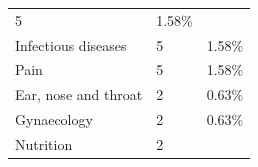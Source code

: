 \documentclass[]{article}
\begin{document}
\begin{longtable}[]{@{}lll@{}}
\begin{minipage}[t]{0.18\columnwidth}
5\strut
\end{minipage} & \begin{minipage}[t]{0.18\columnwidth}\raggedright
1.58\%\strut
\end{minipage}\tabularnewline
\begin{minipage}[t]{0.34\columnwidth}\raggedright
Infectious diseases\strut
\end{minipage} & \begin{minipage}[t]{0.18\columnwidth}\raggedright
5\strut
\end{minipage} & \begin{minipage}[t]{0.18\columnwidth}\raggedright
1.58\%\strut
\end{minipage}\tabularnewline
\begin{minipage}[t]{0.34\columnwidth}\raggedright
Pain\strut
\end{minipage} & \begin{minipage}[t]{0.18\columnwidth}\raggedright
5\strut
\end{minipage} & \begin{minipage}[t]{0.18\columnwidth}\raggedright
1.58\%\strut
\end{minipage}\tabularnewline
\begin{minipage}[t]{0.34\columnwidth}\raggedright
Ear, nose and throat\strut
\end{minipage} & \begin{minipage}[t]{0.18\columnwidth}\raggedright
2\strut
\end{minipage} & \begin{minipage}[t]{0.18\columnwidth}\raggedright
0.63\%\strut
\end{minipage}\tabularnewline
\begin{minipage}[t]{0.34\columnwidth}\raggedright
Gynaecology\strut
\end{minipage} & \begin{minipage}[t]{0.18\columnwidth}\raggedright
2\strut
\end{minipage} & \begin{minipage}[t]{0.18\columnwidth}\raggedright
0.63\%\strut
\end{minipage}\tabularnewline
\begin{minipage}[t]{0.34\columnwidth}\raggedright
Nutrition\strut
\end{minipage} & \begin{minipage}[t]{0.18\columnwidth}\raggedright
2\strut
\end{minipage} & \begin{minipage}[t]{0.18\columnwidth}\raggedright

\end{minipage}
\end{longtable}
\end{document}
